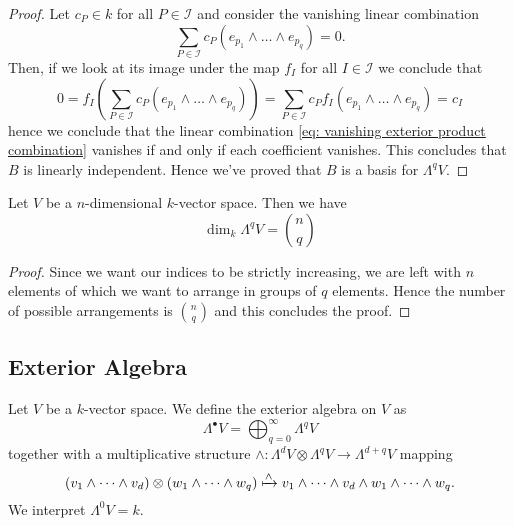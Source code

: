\begin{proof}
    Let \(c_P \in k\) for all \(P \in \mathcal I\) and consider the vanishing
    linear combination
    \begin{equation}\label{eq: vanishing exterior product combination}
        \sum_{P \in \mathcal I} c_P (e_{p_1} \wedge \dots \wedge e_{p_q}) = 0.
    \end{equation}
    Then, if we look at its image under the map \(f_I\) for all \(I \in \mathcal
    I\) we conclude that
    \[
        0 = f_I\left( \sum_{P \in \mathcal I} c_P (e_{p_1} \wedge \dots \wedge
        e_{p_q}) \right) = \sum_{P \in \mathcal I} c_P f_I(e_{p_1} \wedge \dots \wedge
        e_{p_q}) = c_I
    \]
    hence we conclude that the linear combination \cref{eq: vanishing exterior
        product combination} vanishes if and only if each coefficient vanishes. This
    concludes that \(B\) is linearly independent. Hence we've proved that \(B\) is
    a basis for \(\Lambda^q V\).
\end{proof}

\begin{proposition}
    Let \(V\) be a \(n\)-dimensional \(k\)-vector space. Then we have
    \[
        \dim_k \Lambda^q V = \binom n q
    \]
\end{proposition}

\begin{proof}
    Since we want our indices to be strictly increasing, we are left with \(n\)
    elements of which we want to arrange in groups of \(q\) elements. Hence the
    number of possible arrangements is \(\binom n q\) and this concludes the
    proof.
\end{proof}

\subsection{Exterior Algebra}

\begin{definition}
    \label{def: exterior algebra}
    Let \(V\) be a \(k\)-vector space. We define the exterior algebra on \(V\) as
    \[
        \Lambda^\bullet V = \bigoplus_{q=0}^\infty \Lambda^q V
    \]
    together with a multiplicative structure \(\wedge: \Lambda^d V \otimes
    \Lambda^q V \to \Lambda^{d+q} V\) mapping
    \[
        (v_1 \wedge \dots \wedge v_d) \otimes (w_1 \wedge \dots \wedge w_q) \xmapsto
        \wedge v_1 \wedge \dots \wedge v_d \wedge w_1 \wedge \dots \wedge w_q.
    \]
    We interpret \(\Lambda^0 V = k\).
\end{definition}

